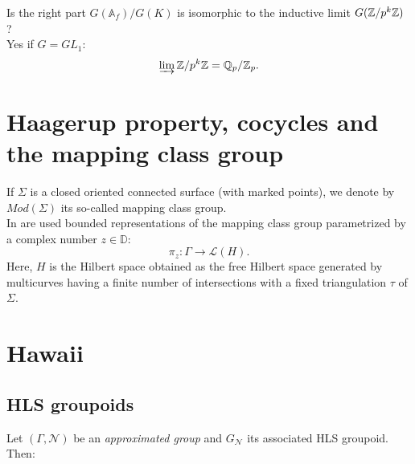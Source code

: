 Is the right part $G(\mathbb A_f)/ G(K)$ is isomorphic to the inductive limit $G(\mathbb Z / p^k \mathbb Z)$ ?\\

Yes if $G= GL_1$: \[ \varinjlim \mathbb Z / p^k \mathbb Z = \mathbb Q_p / \mathbb Z_p.\]

\section{Haagerup property, cocycles and the mapping class group}

If $\Sigma$ is a closed oriented connected surface (with marked points), we denote by $Mod(\Sigma)$ its so-called mapping class group.\\

In \cite{CostantinoMartelli} are used bounded representations of the mapping class group parametrized by a complex number $z\in \mathbb D$:
\[\pi_z : \Gamma \rightarrow \mathcal L(H).\]
Here, $H$ is the Hilbert space obtained as the free Hilbert space generated by multicurves having a finite number of intersections with a fixed triangulation $\tau$ of $\Sigma$. 

\section{Hawaii}

\subsection{HLS groupoids}

Let $(\Gamma,\mathcal N)$ be an \textit{approximated group} and $G_{\mathcal N}$ its associated HLS groupoid. Then:

